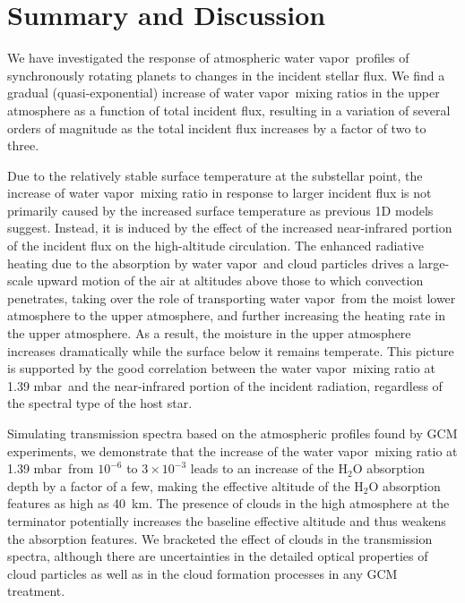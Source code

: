 \documentclass[11pt,numberedappendix,twocolappendix,]{emulateapj}
\def\water{H$_2$O }
\def\preslevel{1.39 mbar\ }
\newcommand{\yf}[1]{{\color{orange}#1}}
\newcommand{\wv}{water vapor\ }
\begin{document}
\section{Summary and Discussion}
\label{s:summary}

We have investigated the response of atmospheric \wv profiles of synchronously rotating planets to changes in the incident stellar flux. 
We find a gradual (quasi-exponential) increase of \wv mixing ratios in the upper atmosphere as a function of total incident flux, resulting in a variation of several orders of magnitude as the total incident flux increases by a factor of two to three. 

Due to the relatively stable surface temperature at the substellar point, the increase of \wv mixing ratio in response to larger incident flux is not primarily caused by the increased surface temperature as previous 1D models suggest. 
Instead, it is induced by \yf{the effect of } the increased near-infrared portion of the incident flux \yf{on the high-altitude circulation}. 
The enhanced radiative heating due to the absorption by \wv \yf{and cloud particles} drives \yf{a large-scale} upward motion of the air \yf{at altitudes above those to which convection penetrates, taking over}
the role of transporting \wv from the moist lower atmosphere to the upper atmosphere, and further increasing the heating rate in the upper atmosphere.
As a result, the moisture in the upper atmosphere increases dramatically while the surface below it remains temperate. 
This picture is supported by the good correlation between the \wv mixing ratio at \preslevel and the near-infrared portion of the incident radiation, regardless of the spectral type of the host star. 

Simulating transmission spectra based on the atmospheric profiles found by GCM experiments, 
we demonstrate that the increase of the \wv mixing ratio at \preslevel from $10^{-6}$ to $3 \times 10^{-3}$ leads to an increase of the \water absorption depth by a factor of a few, making the effective altitude of the \water absorption features as high as 40~km. 
The presence of clouds in the high atmosphere at the terminator potentially increases the baseline effective altitude and thus weakens the absorption features. 
We bracketed the effect of clouds in the transmission spectra, 
although there are uncertainties in the detailed optical properties of cloud particles as well as in the cloud formation processes in any GCM treatment. 
\end{document}
